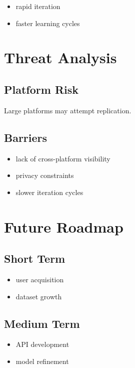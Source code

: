 \documentclass[11pt]{article}
\begin{document}
\begin{itemize}
    \item rapid iteration
    \item faster learning cycles
\end{itemize}

\section{Threat Analysis}

\subsection{Platform Risk}

Large platforms may attempt replication.

\subsection{Barriers}

\begin{itemize}
    \item lack of cross-platform visibility
    \item privacy constraints
    \item slower iteration cycles
\end{itemize}

\section{Future Roadmap}

\subsection{Short Term}

\begin{itemize}
    \item user acquisition
    \item dataset growth
\end{itemize}

\subsection{Medium Term}

\begin{itemize}
    \item API development
    \item model refinement
\end{itemize}
\end{document}
